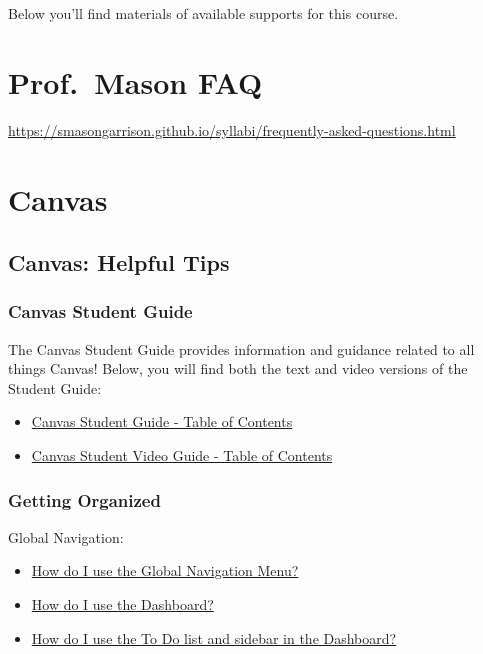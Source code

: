 Below you'll find materials of available supports for this course.

\hypertarget{prof.-mason-faq}{%
\section{Prof.~Mason FAQ}\label{prof.-mason-faq}}

\url{https://smasongarrison.github.io/syllabi/frequently-asked-questions.html}

\hypertarget{canvas}{%
\section{Canvas}\label{canvas}}

\hypertarget{canvas-helpful-tips}{%
\subsection{Canvas: Helpful Tips}\label{canvas-helpful-tips}}

\hypertarget{canvas-student-guide}{%
\subsubsection{Canvas Student Guide}\label{canvas-student-guide}}

The Canvas Student Guide provides information and guidance related to all things Canvas! Below, you will find both the text and video versions of the Student Guide:

\begin{itemize}
\item
  \href{https://community.canvaslms.com/t5/Student-Guide/tkb-p/student}{Canvas Student Guide - Table of Contents}
\item
  \href{https://community.canvaslms.com/t5/Student-Guide/tkb-p/student}{Canvas Student Video Guide - Table of Contents}
\end{itemize}

\hypertarget{getting-organized}{%
\subsubsection{Getting Organized}\label{getting-organized}}

Global Navigation:

\begin{itemize}
\item
  \href{https://community.canvaslms.com/t5/Student-Guide/How-do-I-use-the-Global-Navigation-Menu-as-a-student/ta-p/522}{How do I use the Global Navigation Menu?}
\item
  \href{https://community.canvaslms.com/t5/Student-Guide/How-do-I-use-the-Dashboard-as-a-student/ta-p/512}{How do I use the Dashboard?}
\item
  \href{https://community.canvaslms.com/t5/Student-Guide/How-do-I-use-the-To-Do-list-and-sidebar-in-the-Dashboard-as-a/ta-p/511}{How do I use the To Do list and sidebar in the Dashboard?}
\end{itemize}

